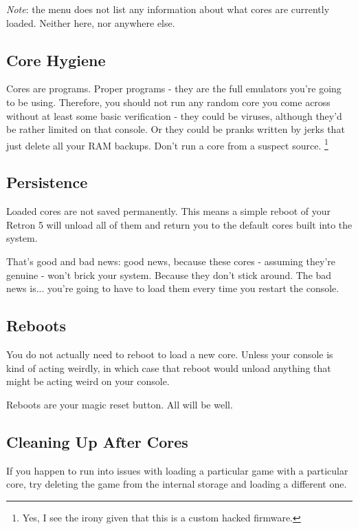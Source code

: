 \documentclass[a4paper]{article}
\begin{document}
\emph{Note}: the menu does not list any information about what cores are currently loaded. Neither here, nor anywhere else.


\subsection{Core Hygiene}

Cores are programs. Proper programs - they are the full emulators you're going to be using. Therefore, you should not run any random core you come across without at least some basic verification - they could be viruses, although they'd be rather limited on that console. Or they could be pranks written by jerks that just delete all your RAM backups. Don't run a core from a suspect source. \footnote{Yes, I see the irony given that this is a custom hacked firmware.}

\subsection{Persistence}

Loaded cores are not saved permanently. This means a simple reboot of your Retron 5 will unload all of them and return you to the default cores built into the system.

That's good and bad news: good news, because these cores - assuming they're genuine - won't brick your system. Because they don't stick around. The bad news is... you're going to have to load them every time you restart the console.

\subsection{Reboots}

You do not actually need to reboot to load a new core. Unless your console is kind of acting weirdly, in which case that reboot would unload anything that might be acting weird on your console.

Reboots are your magic reset button. All will be well.

\subsection{Cleaning Up After Cores}

If you happen to run into issues with loading a particular game with a particular core, try deleting the game from the internal storage and loading a different one.
\end{document}
